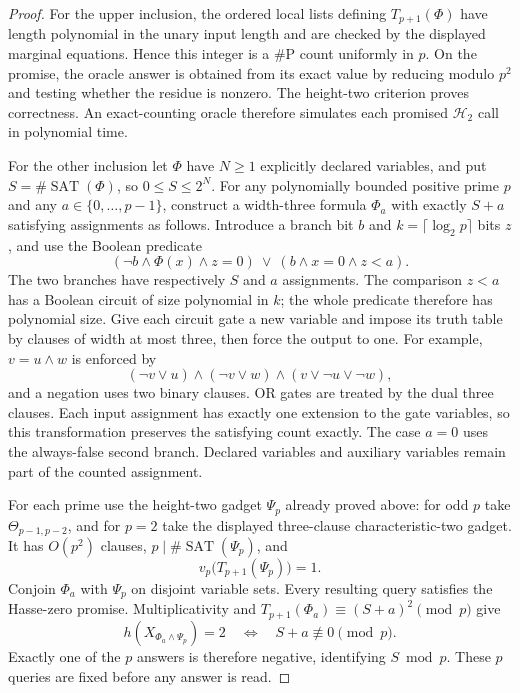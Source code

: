 \begin{proof}
For the upper inclusion, the ordered local lists defining $T_{p+1}(\Phi)$ have length polynomial in the unary input length and are checked by the displayed marginal equations. Hence this integer is a $\#\mathrm P$ count uniformly in $p$. On the promise, the oracle answer is obtained from its exact value by reducing modulo $p^2$ and testing whether the residue is nonzero. The height-two criterion proves correctness. An exact-counting oracle therefore simulates each promised $\mathcal H_2$ call in polynomial time.

For the other inclusion let $\Phi$ have $N\ge1$ explicitly declared variables, and put $S=\#\operatorname{SAT}(\Phi)$, so $0\le S\le2^N$. For any polynomially bounded positive prime $p$ and any $a\in\{0,\ldots,p-1\}$, construct a width-three formula $\Phi_a$ with exactly $S+a$ satisfying assignments as follows. Introduce a branch bit $b$ and $k=\lceil\log_2 p\rceil$ bits $z$, and use the Boolean predicate
\[
 (\neg b\wedge\Phi(x)\wedge z=0)
 \ \vee\
 (b\wedge x=0\wedge z<a).
\]
The two branches have respectively $S$ and $a$ assignments. The comparison $z<a$ has a Boolean circuit of size polynomial in $k$; the whole predicate therefore has polynomial size. Give each circuit gate a new variable and impose its truth table by clauses of width at most three, then force the output to one. For example, $v=u\wedge w$ is enforced by
\[
 (\neg v\vee u)\wedge(\neg v\vee w)
       \wedge(v\vee\neg u\vee\neg w),
\]
and a negation uses two binary clauses. OR gates are treated by the dual three clauses. Each input assignment has exactly one extension to the gate variables, so this transformation preserves the satisfying count exactly. The case $a=0$ uses the always-false second branch. Declared variables and auxiliary variables remain part of the counted assignment.

For each prime use the height-two gadget $\Psi_p$ already proved above: for odd $p$ take $\Theta_{p-1,p-2}$, and for $p=2$ take the displayed three-clause characteristic-two gadget. It has $O(p^2)$ clauses, $p\mid\#\operatorname{SAT}(\Psi_p)$, and
\[
 v_p\bigl(T_{p+1}(\Psi_p)\bigr)=1.
\]
Conjoin $\Phi_a$ with $\Psi_p$ on disjoint variable sets. Every resulting query satisfies the Hasse-zero promise. Multiplicativity and $T_{p+1}(\Phi_a)\equiv(S+a)^2\pmod p$ give
\[
 h(X_{\Phi_a\wedge\Psi_p})=2
 \quad\Longleftrightarrow\quad S+a\not\equiv0\pmod p.
\]
Exactly one of the $p$ answers is therefore negative, identifying $S\bmod p$. These $p$ queries are fixed before any answer is read.


\end{proof}
